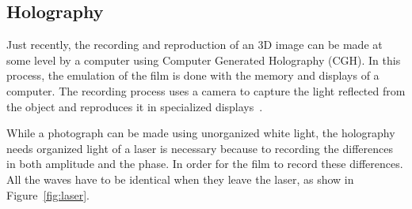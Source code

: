 \subsection{Holography}
\label{sec.holography}



Just recently, the recording and reproduction of an 3D image can be made at some level by a computer using Computer Generated Holography (CGH). In this process, the emulation of the film is done with the memory and displays of a computer. The recording process uses a camera to capture the light reflected from the object and reproduces it in specialized displays~\cite{Lucente1995}.

While a photograph can be made using unorganized white light, the holography needs organized light of a laser is necessary because to recording the differences in both amplitude and the phase. In order for the film to record these differences. All the waves have to be identical when they leave the laser, as show in Figure~\ref{fig:laser}.

